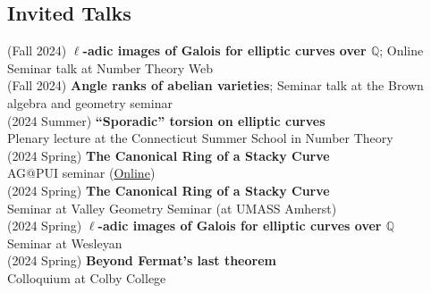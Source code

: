 \documentclass[margin,line]{res}
\begin{document}
\begin{resume}
  \section{\sc Invited Talks}
(Fall 2024) \textbf{$\ell$-adic images of Galois for elliptic curves over $\mathbb{Q}$};
Online Seminar talk at Number Theory Web
\vspace{.05cm}\\  
(Fall 2024) \textbf{Angle ranks of abelian varieties};
Seminar talk at the Brown algebra and geometry seminar
\vspace{.05cm}\\
  (2024 Summer) \textbf{“Sporadic” torsion on elliptic curves}\\
Plenary lecture at the Connecticut Summer School in Number Theory
\vspace{.05cm}\\    
(2024 Spring) \textbf{The Canonical Ring of a Stacky Curve}\\
AG@PUI seminar (\href{https://sites.google.com/fordham.edu/agatpui/home}{Online})
\vspace{.05cm}\\    
(2024 Spring) \textbf{The Canonical Ring of a Stacky Curve}\\
Seminar at Valley Geometry Seminar (at UMASS Amherst)
\vspace{.05cm}\\  
(2024 Spring) \textbf{$\ell$-adic images of Galois for elliptic curves over $\mathbb{Q}$}\\
Seminar at Wesleyan
\vspace{.05cm}\\  
(2024 Spring) \textbf{Beyond Fermat's last theorem}\\
Colloquium at Colby College
\vspace{.05cm}\\  

\end{resume}
\end{document}
